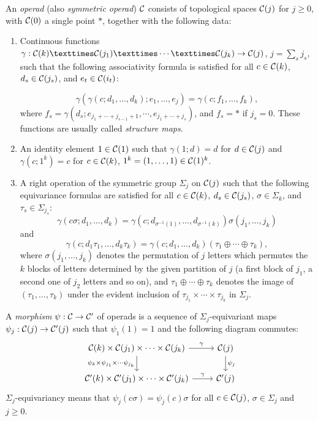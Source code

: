 \documentclass[TFM.tex]{subfiles}
\begin{document}
\begin{defi}\label{operadtop}
An \emph{operad} (also \emph{symmetric operad}) $\mathcal{C}$ consists of topological spaces $\mathcal{C}(j)$ for $j\geq 0$, with $\mathcal{C}(0)$ a single point $*$, together with the following data:
\begin{enumerate}[(1)]
\item Continuous functions $\gamma : \CC(k) × \CC(j_1) × \cdots × \CC(j_k) \to \CC(j)$, $j =\sum_s j_s$, such that the
following associativity formula is satisfied for all $c\in \mathcal{C}(k)$, $d_s \in \mathcal{C}(j_s)$, and $e_t \in \mathcal{C}(i_t)$:

\[\gamma(
\gamma(c; d_1, \dots , d_k); e_1, \dots , e_j) = 
\gamma(c; f_1, \dots , f_k),
\]
where $f_s = \gamma(d_s; e_{j_1+\cdots+j_{s−1}+1}, \cdots , e_{j_1+\cdots+j_s} )$, and $f_s = *$ if $j_s = 0$. These functions are usually called \emph{structure maps}.

\item An identity element $1 \in \mathcal{C}(1)$ such that 
$\gamma(1; d) = d$ for $d \in \mathcal{C}(j)$ and 
$\gamma(c; 1^k) = c$ for
$c \in \mathcal{C}(k)$, $1^k = (1, \dots , 1) \in \mathcal{C}(1)^k$.

\item A right operation of the symmetric group $\Sigma_j$ on $\mathcal{C}(j)$ such that the following equivariance
formulas are satisfied for all $c\in \mathcal{C}(k)$, $d_s \in \mathcal{C}(j_s)$, $\sigma\in\Sigma_k$, and $\tau_s\in\Sigma_{j_s}$:
\[
\gamma(c\sigma; d_1, \dots , d_k) = 
\gamma(c; d_{\sigma^{−1}(1)}, \dots , d_{\sigma^{−1}(k)})\sigma(j_1, \dots , j_k)
\]
and 
\[
\gamma(c; d_1\tau_1, \dots , d_k\tau_k) = \gamma(c; d_1, \dots , d_k)(\tau_1\oplus\cdots\oplus\tau_k),
\] 
where $\sigma(j_1, \dots , j_k)$ denotes the
permutation of $j$ letters which permutes the $k$ blocks of letters determined by the given
partition of $j$ (a first block of $j_1$, a second one of $j_2$ letters and so on), and $\tau_1\oplus\cdots\oplus\tau_k$ denotes the image of $(\tau_1, \dots , \tau_k)$ under the evident inclusion of $\tau_{j_1} × \cdots × \tau_{j_k}$ in $\Sigma_j$.
\end{enumerate}
\end{defi}



\begin{defi}
A \emph{morphism} $\psi:\mathcal{C} \to \mathcal{C}'$ of operads is a sequence of $\Sigma_j$-equivariant maps  $\psi_j : \mathcal{C}(j)\to \mathcal{C}'(j)$ such that
 $\psi_1(1) = 1$ and the following diagram commutes:
 \[
 \begin{tikzcd}
\CC(k)\times \CC(j_1)\times\cdots\times \CC(j_k) \arrow[r, "\gamma"] \arrow[d, "\psi_k\times\psi_{j_1}\times\cdots\psi_{j_k}"'] & \CC(j) \arrow[d, "\psi_j"] \\
\CC'(k)\times \CC'(j_1)\times\cdots\times \CC'(j_k) \arrow[r, "\gamma"]                                                         & \CC'(j)                   
\end{tikzcd}\]
$\Sigma_j$-equivariancy means that $\psi_j(c\sigma)=\psi_j(c)\sigma$ for all $c\in \mathcal{C}(j)$, $\sigma\in\Sigma_j$ and $j\geq 0$. 
\end{defi}
\end{document}
